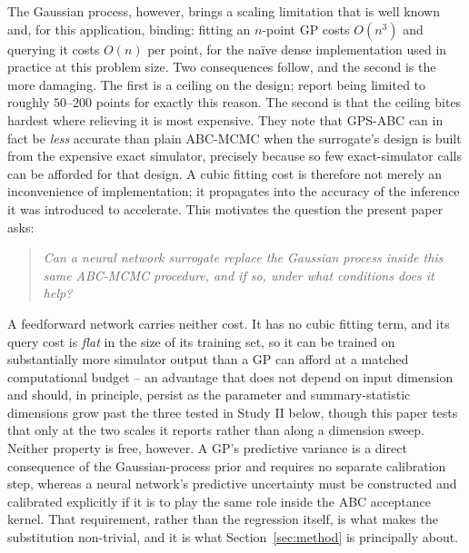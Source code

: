 \documentclass[sn-basic,iicol,pdflatex]{sn-jnl}
\begin{document}
The Gaussian process, however, brings a scaling limitation that is well known
and, for this application, binding: fitting an $n$-point GP costs $O(n^3)$ and
querying it costs $O(n)$ per point, for the na\"ive dense implementation used in
practice at this problem size. Two consequences follow, and the second is the
more damaging. The first is a ceiling on the design; \citet{lu2023} report being
limited to roughly $50$--$200$ points for exactly this reason. The second is
that the ceiling bites hardest where relieving it is most expensive. They note
that GPS-ABC can in fact be \emph{less} accurate than plain ABC-MCMC when the
surrogate's design is built from the expensive exact simulator, precisely
because so few exact-simulator calls can be afforded for that design. A cubic
fitting cost is therefore not merely an inconvenience of implementation; it
propagates into the accuracy of the inference it was introduced to accelerate.
This motivates the question the present paper asks:

\begin{quote}
\emph{Can a neural network surrogate replace the Gaussian process inside this
same ABC-MCMC procedure, and if so, under what conditions does it help?}
\end{quote}

A feedforward network carries neither cost. It has no cubic fitting term, and
its query cost is \emph{flat} in the size of its training set, so it can be
trained on substantially more simulator output than a GP can afford at a matched
computational budget -- an advantage that does not depend on input dimension
and should, in principle, persist as the parameter and summary-statistic
dimensions grow past the three tested in Study II below, though this paper
tests that only at the two scales it reports rather than along a dimension
sweep. Neither property is free, however. A GP's predictive variance is a direct consequence of the
Gaussian-process prior and requires no separate calibration step, whereas a
neural network's predictive uncertainty must be constructed and calibrated
explicitly if it is to play the same role inside the ABC acceptance kernel. That
requirement, rather than the regression itself, is what makes the substitution
non-trivial, and it is what Section~\ref{sec:method} is principally about.
\end{document}
